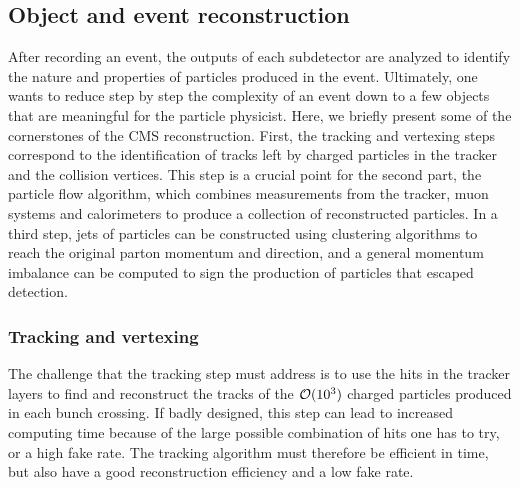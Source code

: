     \subsection{Object and event reconstruction}


    After recording an event, the outputs of each subdetector
    are analyzed to identify the nature and properties of particles produced in the
    event. Ultimately, one wants to reduce step by step the complexity of an event down to
    a few objects that are meaningful for the particle physicist. Here, we briefly present some of the
    cornerstones of the CMS reconstruction. First, the tracking and vertexing steps
    correspond to the identification of tracks left by charged particles in the tracker
    and the collision vertices. This step is a crucial point for the second part, the
    particle flow algorithm, which combines measurements from the tracker, muon systems
    and calorimeters to produce a collection of reconstructed particles. In a third step,
    jets of particles can be constructed using clustering algorithms to reach the original
    parton momentum and direction, and a general momentum imbalance can be computed
    to sign the production of particles that escaped detection.

        \subsubsection{Tracking and vertexing \label{sec:trackingAndVertexing}}

    The challenge that the tracking step must address is to use the hits in the
    tracker layers to find and reconstruct the tracks of the $\mathcal{O}(10^3)$ charged
    particles produced in each bunch crossing. If badly designed, this step can lead
    to increased computing time because of the large possible combination of hits one
    has to try, or a high fake rate. The tracking algorithm must therefore be efficient
    in time, but also have a good reconstruction efficiency and a low fake rate.

